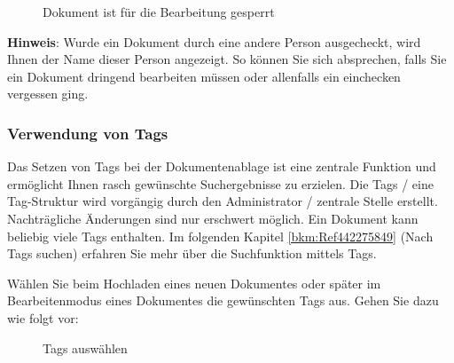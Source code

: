 \begin{figure}[H]
\caption{Dokument ist für die Bearbeitung gesperrt}
\end{figure}

\textbf{Hinweis}: Wurde ein Dokument durch eine andere Person ausgecheckt, wird Ihnen der Name dieser Person angezeigt. So können Sie sich absprechen, falls Sie ein Dokument dringend bearbeiten müssen oder allenfalls ein einchecken vergessen ging.

\pagebreak
\subsubsection{Verwendung von Tags}
\label{bkm:Ref201801219}

Das Setzen von Tags bei der Dokumentenablage ist eine zentrale Funktion und ermöglicht Ihnen rasch gewünschte Suchergebnisse zu erzielen. Die Tags / eine Tag-Struktur wird vorgängig durch den Administrator / zentrale Stelle erstellt. Nachträgliche Änderungen sind nur erschwert möglich. Ein Dokument kann beliebig viele Tags enthalten. Im folgenden Kapitel \ref{bkm:Ref442275849} (Nach Tags suchen) erfahren Sie mehr über die Suchfunktion mittels Tags.

\vspace{\baselineskip}

Wählen Sie beim Hochladen eines neuen Dokumentes oder später im Bearbeitenmodus eines Dokumentes die gewünschten Tags aus. Gehen Sie dazu wie folgt vor: 

\begin{figure}[H]
\caption{Tags auswählen}
\end{figure}

